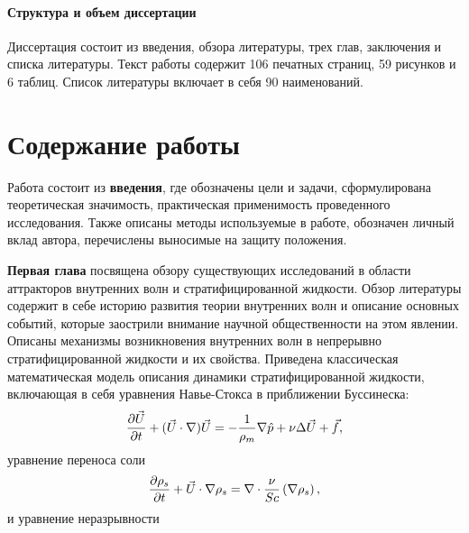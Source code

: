 \documentclass[utf8x]{G7-32} %
\begin{document}
\paragraph{Структура и объем диссертации}

Диссертация состоит из введения, обзора литературы, трех глав, заключения и списка литературы. Текст работы содержит 106 печатных страниц, 59 рисунков и 6 таблиц. Список литературы включает в себя 90 наименований. 


















































\renewcommand\thefigure{\arabic{figure}}

\section*{Содержание работы}

Работа состоит из \textbf{введения}, где обозначены цели и задачи, сформулирована теоретическая значимость, практическая применимость проведенного исследования.  Также описаны методы используемые в работе, обозначен личный вклад автора, перечислены выносимые на защиту положения.

\textbf{Первая глава} посвящена обзору существующих исследований в области аттракторов внутренних волн и стратифицированной жидкости. Обзор литературы содержит в себе историю развития теории внутренних волн и описание основных событий, которые заострили внимание научной общественности на этом явлении. Описаны механизмы возникновения внутренних волн в непрерывно стратифицированной жидкости и их свойства. Приведена классическая математическая модель описания динамики стратифицированной жидкости, включающая в себя 
уравнения Навье-Стокса в приближении Буссинеска:
\begin{equation*}
 \large \frac{\partial \vec U}{\partial t} + (\vec U \cdot \nabla) \vec U = - \frac{1}{\rho_m} \nabla \hat p + \nu \Delta \vec U  + \vec f,
 \label{eq:momClassic}
\end{equation*}
\noindent уравнение переноса соли %
\begin{equation*}
 \large \frac{\partial \rho_s}{\partial t} + \vec U \cdot \nabla \rho_s  = \nabla \cdot \frac{\nu}{Sc} \left ( \nabla \rho_s \right ),
 \label{eq:transClassic}
\end{equation*}
\noindent и уравнение неразрывности
\end{document}
